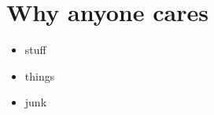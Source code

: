 \documentclass{beamer}
\begin{document}
\section*{Why anyone cares}
\begin{frame}
	\begin{itemize}
		\item stuff
		\item things
		\item junk
	\end{itemize}
\end{frame}



	
\end{document}
